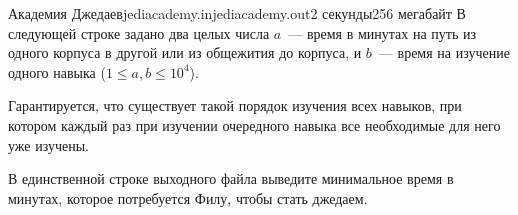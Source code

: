 \begin{problem}{Академия Джедаев}{jediacademy.in}{jediacademy.out}{2 секунды}{256 мегабайт}
В следующей строке задано два целых числа $a$~--- время в минутах на путь из одного корпуса
в другой или из общежития до корпуса, и $b$~--- время на изучение одного навыка ($1 \le a, b \le 10^4$).

Гарантируется, что существует такой порядок изучения всех навыков, при котором каждый
раз при изучении очередного навыка все необходимые для него уже изучены. 

\OutputFile                        
В единственной строке выходного файла выведите минимальное время в минутах, которое потребуется
Филу, чтобы стать джедаем.

\Example
\begin{example}%
%
\end{example}

\end{problem}
